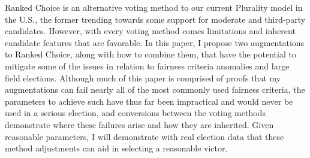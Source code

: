 
Ranked Choice is an alternative voting method to our current Plurality model in the U.S., the former trending towards some support for moderate and third-party candidates. However, with every voting method comes limitations and inherent candidate features that are favorable. In this paper, I propose two augmentations to Ranked Choice, along with how to combine them, that have the potential to mitigate some of the issues in relation to fairness criteria anomalies and large field elections. Although much of this paper is comprised of proofs that my augmentations can fail nearly all of the most commonly used fairness criteria, the parameters to achieve such have thus far been impractical and would never be used in a serious election, and conversions between the voting methods demonstrate where these failures arise and how they are inherited. Given reasonable parameters, I will demonstrate with real election data that these method adjustments can aid in selecting a reasonable victor.